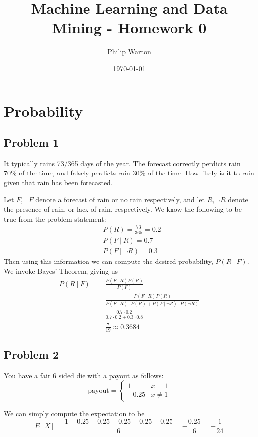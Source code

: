 \documentclass{article}
\theoremstyle{definition}
\begin{document}
\title{Machine Learning and Data Mining - Homework 0}
\author{Philip Warton}
\date{\today}
\maketitle
\section{Probability}
    \subsection*{Problem 1}
        \begin{mdframed}[]
            It typically rains 73/365 days of the year. The forecast correctly perdicts rain $70\%$ of the time, and falsely
            perdicts rain $30\%$ of the time. How likely is it to rain given that rain has been forecasted.
        \end{mdframed}
        Let $F, \neg F$ denote a forecast of rain or no rain respectively, and let $R, \neg R$ denote the presence of rain, or lack of rain, respectively.
        We know the following to be true from the problem statement:
        \begin{align*}
            &P(R) = \frac{73}{365} = 0.2 \\
            &P(F \ |\ R) =  0.7 \\
            &P(F\ |\ \neg R) = 0.3 
        \end{align*}
        Then using this information we can compute the desired probability, $P(R \ | \ F)$. We invoke Bayes' Theorem, giving us 
        \begin{align*}
            P(R \ | \ F) &= \frac{P(F \ | \ R)P(R)}{P(F)}\\
            &=  \frac{P(F \ | \ R)P(R)}{P(F \ | \ R)\cdot P(R) + P(F \ | \ \neg R) \cdot P(\neg R)}\\
            &= \frac{0.7 \cdot 0.2}{0.7 \cdot 0.2 + 0.3 \cdot 0.8}\\
            &= \frac{7}{19} \approx 0.3684
        \end{align*}
    \subsection*{Problem 2}
        \begin{mdframed}[]
            You have a fair 6 sided die with a payout as follows:
            \[
                \text{payout} = \begin{cases}
                    1 & x=1\\
                    -0.25 & x \neq 1
                \end{cases}
            \]
        \end{mdframed}
        We can simply compute the expectation to be 
        \[
            E[X] = \frac{1 - 0.25 - 0.25 - 0.25 - 0.25 - 0.25}{6} = -\frac{0.25}{6} = -\frac{1}{24} 
        \]
\end{document}
